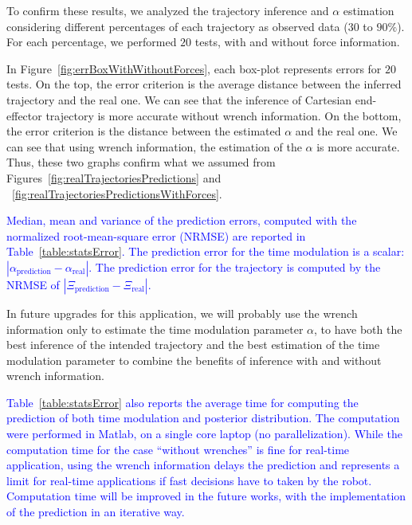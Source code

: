 \documentclass[utf8]{frontiersSCNS} %
\newcommand{\rev}[1]{\textcolor{blue}{#1}}
\begin{document}


To confirm these results, we analyzed the trajectory inference and $\alpha$ estimation considering different percentages of each trajectory as observed data ($30$ to $90\%$). For each percentage, we performed $20$ tests, with and without force information.


In Figure~\ref{fig:errBoxWithWithoutForces}, each box-plot represents errors for $20$ tests.
On the top, the error criterion is the average distance between the inferred trajectory and the real one. We can see that the inference of Cartesian end-effector trajectory is more accurate without wrench information.
On the bottom, the error criterion is the distance between the estimated $\alpha$ and the real one. We can see that using wrench information, the estimation of the $\alpha$ is more accurate.
Thus, these two graphs confirm what we assumed from Figures~\ref{fig:realTrajectoriesPredictions} and ~\ref{fig:realTrajectoriesPredictionsWithForces}. 

\rev{Median, mean and variance of the prediction errors, computed with the normalized root-mean-square error (NRMSE) are reported in Table~\ref{table:statsError}. 
The prediction error for the time modulation is a scalar: $|\alpha_{\textrm{prediction}} - \alpha_{\textrm{real}} |$.   
The prediction error for the trajectory is computed by the NRMSE of $| \Xi_{\textrm{prediction}} - \Xi_{\textrm{real}}  |$.}

In future upgrades for this application, we will probably use the wrench information only to estimate the time modulation parameter $\alpha$, to have both the best inference of the intended trajectory and the best estimation of the time modulation parameter to combine the benefits of inference with and without wrench information.


\rev{
Table~\ref{table:statsError} also reports the average time for computing the prediction of both time modulation and posterior distribution.  The computation were performed in Matlab, on a single core laptop (no parallelization). While the computation time for the case ``without wrenches'' is fine for real-time application, using the wrench information delays the prediction and represents a limit for real-time applications if fast decisions have to taken by the robot. Computation time will be improved in the future works, with the implementation of the prediction in an iterative way.
}
\end{document}
